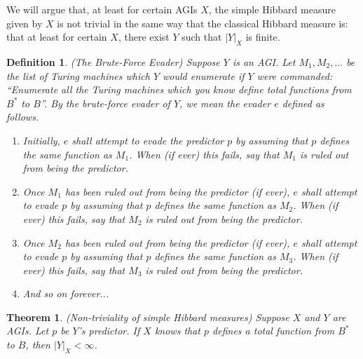 \documentclass{article}
\newtheorem{definition}{Definition}
\newtheorem{theorem}{Theorem}
\begin{document}
We will argue that, at least for certain AGIs $X$,
the simple Hibbard measure given by $X$ is
not trivial in the same way that the classical Hibbard measure is:
that at least for certain $X$, there exist $Y$ such that
$|Y|_X$ is finite.

\begin{definition}
    (The Brute-Force Evader)
    Suppose $Y$ is an AGI. Let $M_1,M_2,\ldots$ be the
    list of Turing machines which $Y$ would enumerate if $Y$ were commanded:
    ``Enumerate all the Turing machines which you know define total functions
    from $B^*$ to $B$''. By the \emph{brute-force evader of $Y$}, we mean the
    evader $e$ defined as follows.
    \begin{enumerate}
        \item
        Initially, $e$ shall attempt to evade the predictor $p$ by assuming that
        $p$ defines the same function as $M_1$. When (if ever) this fails,
        say that \emph{$M_1$ is ruled out from being the predictor}.
        \item
        Once $M_1$ has been ruled out from being the predictor (if ever),
        $e$ shall attempt to evade $p$ by assuming that $p$ defines the same
        function as $M_2$. When (if ever) this fails,
        say that \emph{$M_2$ is ruled out from being the predictor}.
        \item
        Once $M_2$ has been ruled out from being the predictor (if ever),
        $e$ shall attempt to evade $p$ by assuming that $p$ defines the same
        function as $M_3$. When (if ever) this fails,
        say that \emph{$M_3$ is ruled out from being the predictor}.
        \item
        And so on forever...
    \end{enumerate}
\end{definition}

\begin{theorem}
    (Non-triviality of simple Hibbard measures)
    Suppose $X$ and $Y$ are AGIs. Let $p$ be $Y$'s predictor.
    If $X$ knows that $p$ defines a total function from $B^*$ to $B$,
    then $|Y|_X<\infty$.
\end{theorem}
\end{document}
